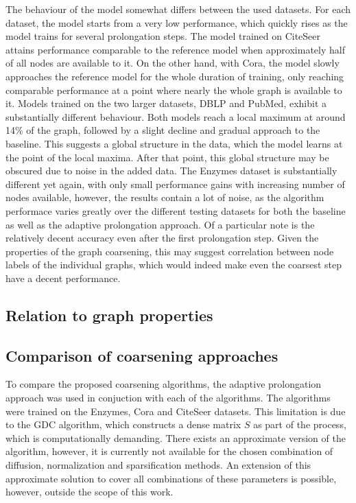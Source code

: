 The behaviour of the model somewhat differs between the used datasets. For each dataset, the model starts from a very low performance, which quickly rises as the model trains for several prolongation steps. The model trained on CiteSeer attains performance comparable to the reference model when approximately half of all nodes are available to it. On the other hand, with Cora, the model slowly approaches the reference model for the whole duration of training, only reaching comparable performance at a point where nearly the whole graph is available to it. Models trained on the two larger datasets, DBLP and PubMed, exhibit a substantially different behaviour. Both models reach a local maximum at around 14\% of the graph, followed by a slight decline and gradual approach to the baseline. This suggests a global structure in the data, which the model learns at the point of the local maxima. After that point, this global structure may be obscured due to noise in the added data. The Enzymes dataset is substantially different yet again, with only small performance gains with increasing number of nodes available, however, the results contain a lot of noise, as the algorithm performace varies greatly over the different testing datasets for both the baseline as well as the adaptive prolongation approach. Of a particular note is the relatively decent accuracy even after the first prolongation step. Given the properties of the graph coarsening, this may suggest correlation between node labels of the individual graphs, which would indeed make even the coarsest step have a decent performance.


\subsection{Relation to graph properties}


\subsection{Comparison of coarsening approaches}

To compare the proposed coarsening algorithms, the adaptive prolongation approach was used in conjuction with each of the algorithms. The algorithms were trained on the Enzymes, Cora and CiteSeer datasets. This limitation is due to the GDC algorithm, which constructs a dense matrix \( S \) as part of the process, which is computationally demanding. There exists an approximate version of the algorithm, however, it is currently not available for the chosen combination of diffusion, normalization and sparsification methods. An extension of this approximate solution to cover all combinations of these parameters is possible, however, outside the scope of this work.

